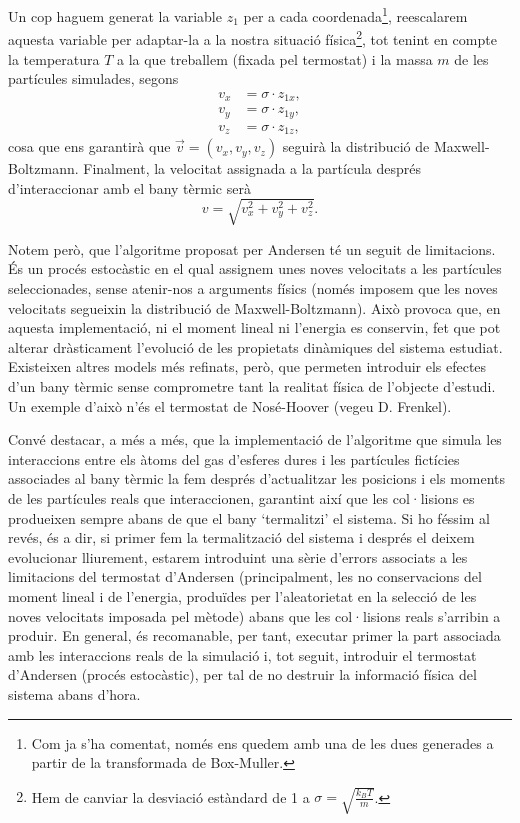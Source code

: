 \documentclass[a4paper,10.5pt]{report}
\begin{document}
\begin{enumerate}
	Un cop haguem generat la variable $z_1$ per a cada coordenada\footnote{Com ja s'ha comentat, només ens quedem amb una de les dues generades a partir de la transformada de Box-Muller.}, reescalarem aquesta variable per adaptar-la a la nostra situació física\footnote{Hem de canviar la desviació estàndard de 1 a $\sigma = \sqrt{\frac{k_B T}{m}}$.}, tot tenint en compte la temperatura $T$ a la que treballem (fixada pel termostat) i la massa $m$ de les partícules simulades, segons
	\begin{align}
		v_x &= \sigma \cdot z_{1x}, \\
		v_y &= \sigma \cdot z_{1y}, \\
		v_z &= \sigma \cdot z_{1z},
	\end{align}
	cosa que ens garantirà que $\vec{v} = (v_x, v_y, v_z)$ seguirà la distribució de Maxwell-Boltzmann. Finalment, la velocitat assignada a la partícula després d'interaccionar amb el bany tèrmic serà
	\begin{equation}
		v = \sqrt{v_x^2+v_y^2+v_z^2}.
	\end{equation}
\end{enumerate}

Notem però, que l'algoritme proposat per Andersen té un seguit de limitacions. És un procés estocàstic en el qual assignem unes noves velocitats a les partícules seleccionades, sense atenir-nos a arguments físics (només imposem que les noves velocitats segueixin la distribució de Maxwell-Boltzmann). Això provoca que, en aquesta implementació, ni el moment lineal ni l'energia es conservin, fet que pot alterar dràsticament l'evolució de les propietats dinàmiques del sistema estudiat. Existeixen altres models més refinats, però, que permeten introduir els efectes d'un bany tèrmic sense comprometre tant la realitat física de l'objecte d'estudi. Un exemple d'això n'és el termostat de Nosé-Hoover (vegeu D. Frenkel\cite{ref3}).

Convé destacar, a més a més, que la implementació de l'algoritme que simula les interaccions entre els àtoms del gas d'esferes dures i les partícules fictícies associades al bany tèrmic la fem després d'actualitzar les posicions i els moments de les partícules reals que interaccionen, garantint així que les col·lisions es produeixen sempre abans de que el bany `termalitzi' el sistema. Si ho féssim al revés, és a dir, si primer fem la termalització del sistema i després el deixem evolucionar lliurement, estarem introduint una sèrie d'errors associats a les limitacions del termostat d'Andersen (principalment, les no conservacions del moment lineal i de l'energia, produïdes per l'aleatorietat en la selecció de les noves velocitats imposada pel mètode) abans que les col·lisions reals s'arribin a produir. En general, és recomanable, per tant, executar primer la part associada amb les interaccions reals de la simulació i, tot seguit, introduir el termostat d'Andersen (procés estocàstic), per tal de no destruir la informació física del sistema abans d'hora.
\end{document}
